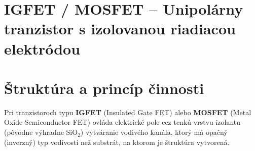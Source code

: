 %
%
\section{IGFET / MOSFET – Unipolárny tranzistor s izolovanou riadiacou elektródou}

\section{Štruktúra a princíp činnosti}
Pri tranzistoroch typu \textbf{IGFET} (Insulated Gate FET) alebo \textbf{MOSFET} (Metal Oxide Semiconductor FET) ovláda elektrické pole cez tenkú vrstvu izolantu (pôvodne výhradne $\text{SiO}_2$) vytváranie vodivého kanála, ktorý má opačný (inverzný) typ vodivosti než substrát, na ktorom je štruktúra vytvorená.

